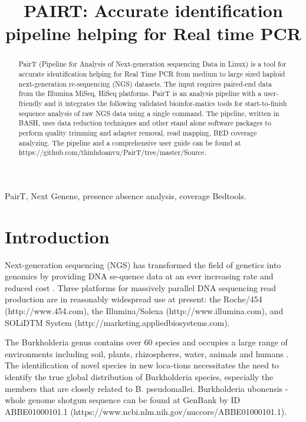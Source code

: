 \documentclass[conference]{IEEEtran}
\begin{document}
\title{PAIRT: Accurate identification pipeline helping for Real time PCR\\
}

\author{
}
\maketitle

\begin{abstract}
PairT (Pipeline for Analysis of Next-generation sequencing Data in Linux) is a tool for accurate identification helping for Real Time PCR  from medium to large sized haploid next-generation re-sequencing (NGS) datasets. The input requires paired-end data from the Illumina MiSeq, HiSeq platforms. PairT is an analysis pipeline with a user-friendly and it integrates the following validated bioinfor-matics tools for start-to-finish sequence analysis of raw NGS data using a single command.  The pipeline, written in BASH, uses data reduction techniques and other stand alone software packages to perform quality trimming and adapter removal, read mapping, BED coverage analyzing. The pipeline and a comprehensive user guide can be found at https://github.com/thinhdoanvu/PairT/tree/master/Source.
\end{abstract}

\begin{IEEEkeywords}
PairT, Next Genene, presence absence analysis, coverage Bedtools.
\end{IEEEkeywords}

\section{Introduction}
Next-generation sequencing (NGS) has transformed the field of genetics into genomics by providing DNA se-quence data at an ever increasing rate and reduced cost \cite{ER2008}. Three platforms for massively parallel DNA sequencing read production are in reasonably widespread use at present: the Roche/454 (http://www.454.com), the Illumina/Solexa (http://www.illumina.com), and SOLiDTM System (http://marketing.appliedbiosystems.com).

The Burkholderia genus contains over 60 species and occupies a large range of environments including soil, plants, rhizospheres, water, animals and humans \cite{Ginther2015}. The identification of novel species in new loca-tions necessitates the need to identify the true global distribution of Burkholderia species, especially the members that are closely related to B. pseudomallei. Burkholderia ubonensis - whole genome shotgun sequence can be found at GenBank by ID ABBE01000101.1 (https://www.ncbi.nlm.nih.gov/nuccore/ABBE01000101.1).
\end{document}
